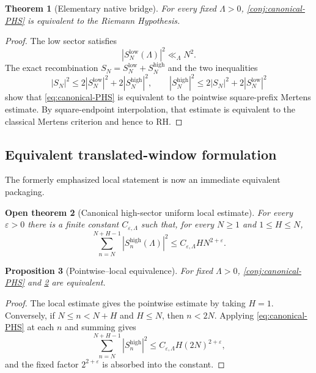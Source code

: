 \documentclass[11pt]{article}
\newtheorem{theorem}{Theorem}[section]
\newtheorem{proposition}[theorem]{Proposition}
\newtheorem{conjecture}[theorem]{Open theorem}
\theoremstyle{definition}
\newcommand{\eps}{\varepsilon}
\newcommand{\1}{\mathbf{1}}
\begin{document}
\begin{theorem}[Elementary native bridge]
\label{thm:canonical-PHS-iff-RH}
For every fixed $\Lambda>0$, \cref{conj:canonical-PHS} is equivalent to the Riemann Hypothesis.
\end{theorem}

\begin{proof}
The low sector satisfies
\[
 |S_N^{\mathrm{low}}(\Lambda)|^2
 \ll_\Lambda N^2.
\]
The exact recombination $S_N=S_N^{\mathrm{low}}+S_N^{\mathrm{high}}$ and the two inequalities
\[
 |S_N|^2\le2|S_N^{\mathrm{low}}|^2+2|S_N^{\mathrm{high}}|^2,
 \qquad
 |S_N^{\mathrm{high}}|^2\le2|S_N|^2+2|S_N^{\mathrm{low}}|^2
\]
show that \cref{eq:canonical-PHS} is equivalent to the pointwise square-prefix Mertens estimate.  By square-endpoint interpolation, that estimate is equivalent to the classical Mertens criterion and hence to RH.
\end{proof}

\subsection{Equivalent translated-window formulation}

The formerly emphasized local statement is now an immediate equivalent packaging.

\begin{conjecture}[Canonical high-sector uniform local estimate]
\label{conj:canonical-HS}
For every $\eps>0$ there is a finite constant $C_{\eps,\Lambda}$ such that, for every $N\ge1$ and $1\le H\le N$,
\begin{equation}
 \boxed{
 \sum_{n=N}^{N+H-1}
 \left|S_n^{\mathrm{high}}(\Lambda)\right|^2
 \le C_{\eps,\Lambda}HN^{2+\eps}.
 }
 \tag{HS}
 \label{eq:canonical-HS}
\end{equation}
\end{conjecture}

\begin{proposition}[Pointwise--local equivalence]
\label{prop:PHS-HS-equivalence}
For fixed $\Lambda>0$, \cref{conj:canonical-PHS} and \cref{conj:canonical-HS} are equivalent.
\end{proposition}

\begin{proof}
The local estimate gives the pointwise estimate by taking $H=1$.  Conversely, if $N\le n<N+H$ and $H\le N$, then $n<2N$.  Applying \cref{eq:canonical-PHS} at each $n$ and summing gives
\[
 \sum_{n=N}^{N+H-1}|S_n^{\mathrm{high}}|^2
 \le C_{\eps,\Lambda}H(2N)^{2+\eps},
\]
and the fixed factor $2^{2+\eps}$ is absorbed into the constant.
\end{proof}
\end{document}
